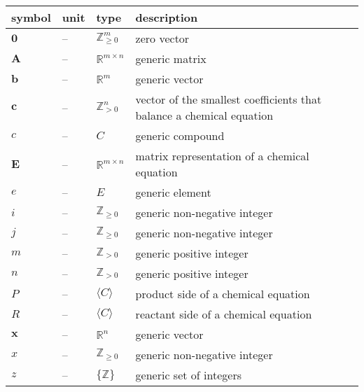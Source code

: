 \documentclass[12pt]{article}
\newcommand*{\nonnegInt}{\mathbb{Z}_{\geq 0}}
\newcommand*{\posInt}{\mathbb{Z}_{> 0}}
\begin{document}
\noindent \begin{tabularx}{\textwidth}{l l l X} \toprule
  \textbf{symbol} & \textbf{unit} & \textbf{type}             & \textbf{description}                         \\
  \midrule
  $\textbf{0}$    & --            & $\nonnegInt^{m}$          & zero vector                                  \\
  $\textbf{A}$    & --            & $\mathbb{R}^{m \times n}$ & generic matrix                               \\
  $\textbf{b}$    & --            & $\mathbb{R}^{m}$          & generic vector                               \\
  $\textbf{c}$    & --            & $\posInt^{n}$             & vector of the smallest coefficients
  that balance a chemical equation                                                                           \\
  $c$             & --            & $C$                       & generic compound                             \\
  $\textbf{E}$    & --            & $\mathbb{R}^{m \times n}$ & matrix representation of a chemical equation \\
  $e$             & --            & $E$                       & generic element                              \\
  $i$             & --            & $\nonnegInt$              & generic non-negative integer                 \\
  $j$             & --            & $\nonnegInt$              & generic non-negative integer                 \\
  $m$             & --            & $\posInt$                 & generic positive integer                     \\
  $n$             & --            & $\posInt$                 & generic positive integer                     \\
  $P$             & --            & $\langle C \rangle$       & product side of a chemical equation          \\
  $R$             & --            & $\langle C \rangle$       & reactant side of a chemical equation         \\
  $\textbf{x}$    & --            & $\mathbb{R}^{n}$          & generic vector                               \\
  $x$             & --            & $\nonnegInt$              & generic non-negative integer                 \\
  $z$             & --            & $\{ \mathbb{Z} \}$        & generic set of integers                      \\
  \bottomrule
\end{tabularx}
\end{document}
